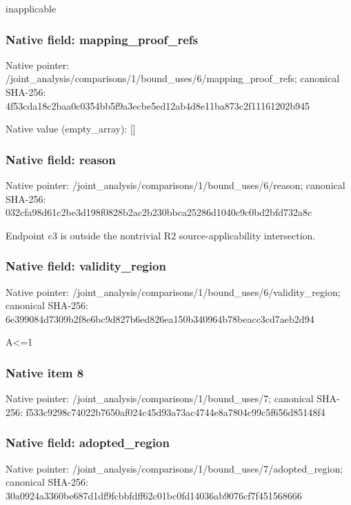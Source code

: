 \documentclass[10pt,a4paper]{article}
\begin{document}
\begingroup\raggedright\sloppy inapplicable\par\endgroup

\subsubsection{Native field: mapping\_\allowbreak{}proof\_\allowbreak{}refs}
Native pointer: /joint\_\allowbreak{}analysis/comparisons/1/bound\_\allowbreak{}uses/6/mapping\_\allowbreak{}proof\_\allowbreak{}refs; canonical SHA-256: 4f53cda18c2baa0c0354bb5f9a3ecbe5ed12ab4d8e11ba873c2f11161202b945

Native value (empty\_\allowbreak{}array): []

\subsubsection{Native field: reason}
Native pointer: /joint\_\allowbreak{}analysis/comparisons/1/bound\_\allowbreak{}uses/6/reason; canonical SHA-256: 032cfa98d61c2be3d198f0828b2ac2b230bbca25286d1040c9c0bd2bfd732a8c

\begingroup\raggedright\sloppy Endpoint c3 is outside the nontrivial R2 source-applicability intersection.\par\endgroup

\subsubsection{Native field: validity\_\allowbreak{}region}
Native pointer: /joint\_\allowbreak{}analysis/comparisons/1/bound\_\allowbreak{}uses/6/validity\_\allowbreak{}region; canonical SHA-256: 6e399084d7309b2f8e6bc9d827b6ed826ea150b340964b78beacc3cd7aeb2d94

\begingroup\raggedright\sloppy A<=\allowbreak{}1\par\endgroup

\subsubsection{Native item 8}
Native pointer: /joint\_\allowbreak{}analysis/comparisons/1/bound\_\allowbreak{}uses/7; canonical SHA-256: f533c9298c74022b7650af024c45d93a73ac4744e8a7804c99c5f656d85148f4

\subsubsection{Native field: adopted\_\allowbreak{}region}
Native pointer: /joint\_\allowbreak{}analysis/comparisons/1/bound\_\allowbreak{}uses/7/adopted\_\allowbreak{}region; canonical SHA-256: 30a0924a3360be687d1df9fcbbfdff62c01bc0fd14036ab9076cf7f451568666
\end{document}
